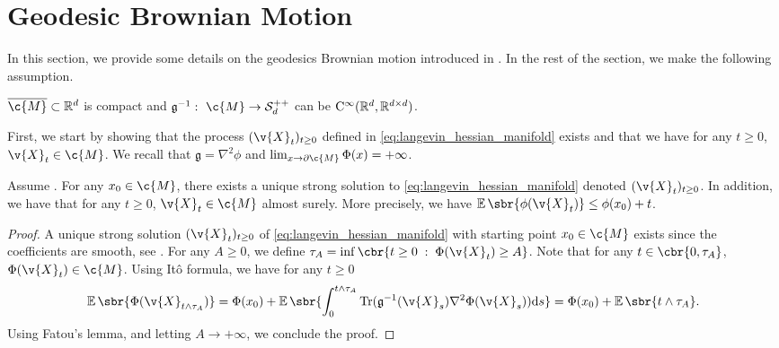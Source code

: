 \section{Geodesic Brownian Motion}
\label{sec:geod-brown-moti}

In this section, we provide some details on the geodesics Brownian motion introduced in .
In the rest of the section, we make the following assumption.

\begin{assumption}
	\label{assum:log_barrier_method}
	\(\cl{\c{M}} \subset \R^d\) is compact and
	\(\mathfrak{g}^{-1}: \ \c{M} \to \mathcal{S}_d^{++}\) can be
	\(\mathrm{C}^\infty(\mathbb{R}^d, \mathbb{R}^{d \times d})\).
\end{assumption}

First, we start by showing that the process \((\v{X}_t)_{t \geq 0}\) defined in \eqref{eq:langevin_hessian_manifold} exists and that we have for any \(t \geq 0\), \(\v{X}_t \in \c{M}\).
We recall that \(\mathfrak{g} = \nabla^2 \phi\) and \(\lim_{x \to \partial \c{M}} \Phi(x) = +\infty\).

\begin{proposition}
	Assume \textup{}.
	For any \(x_0 \in \c{M}\), there exists a unique strong solution to \eqref{eq:langevin_hessian_manifold} denoted \((\v{X}_t)_{t \geq 0}\).
	In addition, we have that for any \(t \geq 0\), \(\v{X}_t \in \c{M}\) almost surely.
	More precisely, we have \(\E\sbr{\phi(\v{X}_t)} \leq \phi(x_0) + t\).
\end{proposition}

\begin{proof}
	A unique strong solution \((\v{X}_t)_{t \geq 0}\) of \eqref{eq:langevin_hessian_manifold} with starting point \(x_0\in \c{M}\) exists since the coefficients are smooth, see \cite[Theorem 3.1, p.165]{ikeda2014stochastic}.
	For any \(A \geq 0\), we define \(\tau_A = \inf \cbr{t \geq 0 \; : \; \Phi(\v{X}_t) \geq A}\).
	Note that for any \(t \in \cbr{0, \tau_A}\), \(\Phi(\v{X}_t) \in \c{M}\).
	Using It\^o formula, we have for any \(t \geq 0\) \begin{equation}  \E\sbr{\Phi(\v{X}_{t \wedge \tau_A})} = \Phi(x_0) + \E\sbr{\int_0^{t \wedge \tau_A} \mathrm{Tr}(\mathfrak{g}^{-1}(\v{X}_s) \nabla^2 \Phi(\v{X}_s) )\mathrm{d} s} = \Phi(x_0) + \E\sbr{t \wedge \tau_A} .
	\end{equation}
	Using Fatou's lemma, and letting \(A \to +\infty\), we conclude the proof.
\end{proof}

